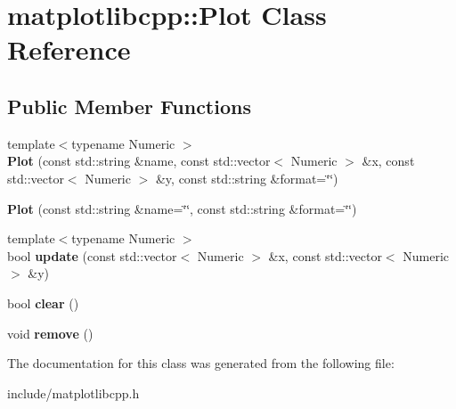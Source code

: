 \hypertarget{classmatplotlibcpp_1_1Plot}{}\section{matplotlibcpp\+:\+:Plot Class Reference}
\label{classmatplotlibcpp_1_1Plot}
\subsection*{Public Member Functions}
\begin{DoxyCompactItemize}
\item 
{\footnotesize template$<$typename Numeric $>$ }\\{\bfseries Plot} (const std\+::string \&name, const std\+::vector$<$ Numeric $>$ \&x, const std\+::vector$<$ Numeric $>$ \&y, const std\+::string \&format=\char`\"{}\char`\"{})\hypertarget{classmatplotlibcpp_1_1Plot_a6ab809f4fc44d6e4eadb100cba5b519e}{}\label{classmatplotlibcpp_1_1Plot_a6ab809f4fc44d6e4eadb100cba5b519e}

\item 
{\bfseries Plot} (const std\+::string \&name=\char`\"{}\char`\"{}, const std\+::string \&format=\char`\"{}\char`\"{})\hypertarget{classmatplotlibcpp_1_1Plot_ab24b1e66f705495fda89621df753ed0b}{}\label{classmatplotlibcpp_1_1Plot_ab24b1e66f705495fda89621df753ed0b}

\item 
{\footnotesize template$<$typename Numeric $>$ }\\bool {\bfseries update} (const std\+::vector$<$ Numeric $>$ \&x, const std\+::vector$<$ Numeric $>$ \&y)\hypertarget{classmatplotlibcpp_1_1Plot_ac515760537365754e3437322e87cfc79}{}\label{classmatplotlibcpp_1_1Plot_ac515760537365754e3437322e87cfc79}

\item 
bool {\bfseries clear} ()\hypertarget{classmatplotlibcpp_1_1Plot_a177f13fea5b50e991a373bdbea36fb59}{}\label{classmatplotlibcpp_1_1Plot_a177f13fea5b50e991a373bdbea36fb59}

\item 
void {\bfseries remove} ()\hypertarget{classmatplotlibcpp_1_1Plot_ac78c9ebb89d13558046ea23eee188aea}{}\label{classmatplotlibcpp_1_1Plot_ac78c9ebb89d13558046ea23eee188aea}

\end{DoxyCompactItemize}


The documentation for this class was generated from the following file\+:\begin{DoxyCompactItemize}
\item 
include/matplotlibcpp.\+h\end{DoxyCompactItemize}
